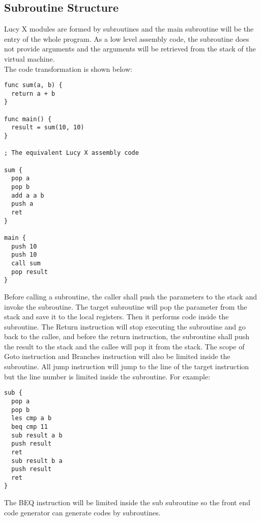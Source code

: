 \subsection{Subroutine Structure}
Lucy X modules are formed by subroutines and the main subroutine will be the entry of the whole program. As a low level assembly code, the subroutine does not provide arguments and the arguments will be retrieved from the stack of the virtual machine. \\
The code transformation is shown below:
\begin{lstlisting}[language=LucyX]
func sum(a, b) {
  return a + b
}

func main() {
  result = sum(10, 10)
}

; The equivalent Lucy X assembly code

sum {
  pop a
  pop b
  add a a b
  push a
  ret
}

main {
  push 10
  push 10
  call sum
  pop result
}
\end{lstlisting}
Before calling a subroutine, the caller shall push the parameters to the stack and invoke the subroutine. The target subroutine will pop the parameter from the stack and save it to the local registers. Then it performs code inside the subroutine. The Return instruction will stop executing the subroutine and go back to the callee, and before the return instruction, the subroutine shall push the result to the stack and the callee will pop it from the stack.
The scope of Goto instruction and Branches instruction will also be limited inside the subroutine. All jump instruction will jump to the line of the target instruction but the line number is limited inside the subroutine. For example:
\begin{lstlisting}[language=LucyX]
sub {
  pop a
  pop b
  les cmp a b
  beq cmp 11
  sub result a b
  push result
  ret
  sub result b a
  push result
  ret
}
\end{lstlisting}
The BEQ instruction will be limited inside the sub subroutine so the front end code generator can generate codes by subroutines.
